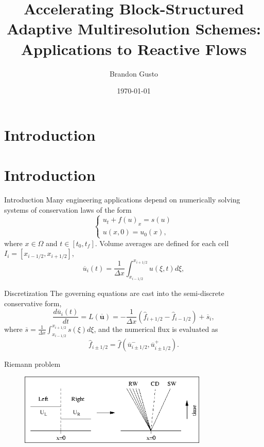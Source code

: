 \documentclass{beamer}
\begin{document}
\section{Introduction}
\title{Accelerating Block-Structured Adaptive Multiresolution Schemes: Applications to
Reactive Flows}
\author{Brandon Gusto} %
\date{\today}
\frame{\titlepage}

\section{Introduction}

\begin{frame}{Introduction}
    Many engineering applications depend on numerically solving systems of conservation laws of the form
    \begin{equation}
    \begin{cases}
      u_{t} + f(u)_{x} = s(u) \\    
      u(x,0) = u_{0}(x),
    \end{cases}
    \label{claw}
    \end{equation}
    where $x \in \Omega$ and $t \in [t_{0},t_{f}]$.
    Volume averages are defined for each cell $I_{i} =
    \left[x_{i-1/2},x_{i+1/2}\right]$,
    \begin{equation}
        \overline{u}_{i}(t) = \frac{1}{\Delta x} \int_{x_{i-1/2}}^{x_{i+1/2}} u(\xi,t) d \xi,
    \end{equation}
\end{frame}

\begin{frame}{Discretization}
    The governing equations are cast into the semi-discrete conservative form,
    \begin{equation}
        \frac{d \overline{u}_{i}(t)}{dt} = L(\overline{\bm{u}}) = -\frac{1}{\Delta x} \left( \hat{f}_{i+1/2} -
        \hat{f}_{i-1/2} \right) + \overline{s}_{i},
        \label{ode}
    \end{equation}
    where $\overline{s} = \frac{1}{\Delta x} \int_{x_{i-1/2}}^{x_{i+1/2}} s(\xi) d
    \xi$, and the numerical flux is evaluated as
    \begin{equation}
        \hat{f}_{i\pm1/2} = \hat{f}(\overline{u}^{-}_{i\pm1/2}, \overline{u}^{+}_{i\pm1/2}).
    \end{equation}
\end{frame}

\begin{frame}{Riemann problem}
    \begin{figure}
        \center
        \includegraphics[width=0.8\textwidth]{riemann.png}
    \end{figure}
\end{frame}
\end{document}
